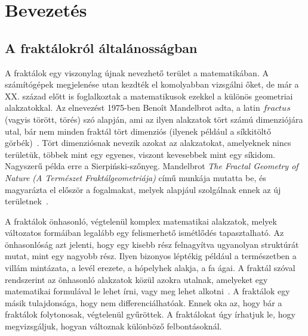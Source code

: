 \chapter{Bevezetés}

\section{A fraktálokról általánosságban}
A fraktálok egy viszonylag újnak nevezhető terület a matematikában. A számítógépek megjelenése utan kezdték el komolyabban vizsgálni őket, de már a XX. század előtt is foglalkoztak a matematikusok ezekkel a különös geometriai alakzatokkal. Az elnevezést 1975-ben Benoît Mandelbrot adta, a latin $fractus$ (vagyis törött, törés) szó alapján, ami az ilyen alakzatok tört számú dimenziójára utal, bár nem minden fraktál tört dimenziós (ilyenek például a síkkitöltő görbék)~\cite{fraktal}. 
Tört dimenziósnak nevezik azokat az alakzatokat, amelyeknek nincs területük, többek mint egy egyenes, viszont kevesebbek mint egy síkidom. Nagyszerű példa erre a Sierpiński-szőnyeg. Mandelbrot {\it The Fractal Geometry of Nature (A Természet Fraktálgeometriája)} című munkája mutatta be, és magyarázta el először a fogalmakat, melyek alapjául szolgálnak ennek az új területnek~\cite{fraktal-wiki}. 
\par A fraktálok önhasonló, végtelenül komplex matematikai alakzatok, melyek változatos formáiban legalább egy felismerhető ismétlődés tapasztalható. Az önhasonlóság azt jelenti, hogy egy kisebb rész felnagyítva ugyanolyan struktúrát mutat, mint egy nagyobb rész. Ilyen bizonyos léptékig például a természetben a villám mintázata, a levél erezete, a hópelyhek alakja, a fa ágai. A fraktál szóval rendszerint az önhasonló alakzatok közül azokra utalnak, amelyeket egy matematikai formulával le lehet írni, vagy meg lehet alkotni~\cite{fraktal}. A fraktálok egy másik tulajdonsága, hogy nem differenciálhatóak. Ennek oka az, hogy bár a fraktálok folytonosak, végtelenül gyűröttek. A fraktálokat úgy írhatjuk le, hogy megvizsgáljuk, hogyan változnak különböző felbontásoknál.

